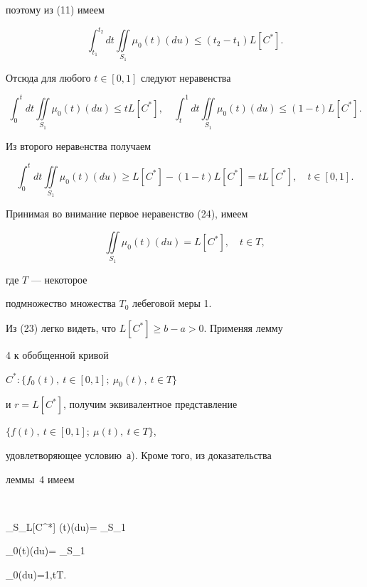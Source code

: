 поэтому из (11) имеем


$$


\int_{t_1}^{t_2} dt \iint\limits_{S_1} \mu_0(t)(du) \leq


(t_2-t_1)L[C^*].


$$


Отсюда для любого $t\in[0,1]$ следуют неравенства


\begin{equation}


\int_{0}^{t} dt \iint\limits_{S_1} \mu_0(t)(du) \leq tL[C^*],\quad


\int_{t}^{1}dt \iint\limits_{S_1} \mu_0(t)(du) \leq (1-t)L[C^*].


\end{equation}


Из второго неравeнства получаем


$$


\int_{0}^{t} dt\iint\limits_{S_1} \mu_0(t)(du) \geq


L[C^*]-(1-t)L[C^*]=tL[C^*],\quad t\in [0,1].


$$


Принимая во внимание первое неравенство (24), имеем


$$


\iint\limits_{S_1} \mu_0(t)(du)=L[C^*],\quad t\in T,


$$


где $T$ --- некоторое


подмножество множества $T_0$ лебеговой меры 1.





Из (23) легко видеть, что $L[C^*] \geq b-a>0$. Применяя лемму


4 к обобщенной кривой


$C^*:\{f_0(t),\ t\in [0,1];\ \mu_0(t),\ t\in T\}$


и $r=L[C^*]$, получим эквивалентное представление


$\{f(t),\ t\in [0,1];\ \mu(t),\ t\in T\}$,


удовлетворяющее условию~а). Кроме того, из доказательства


леммы~4 имеем


$$


\iint\limits_{S_{L[C^*]}} \mu(t)(du)= \iint\limits_{S_1}


\mu_0(t)(du)= \iint\limits_{S_1}


\mu_0(du)=1,\quad t\in T.\quad\square


